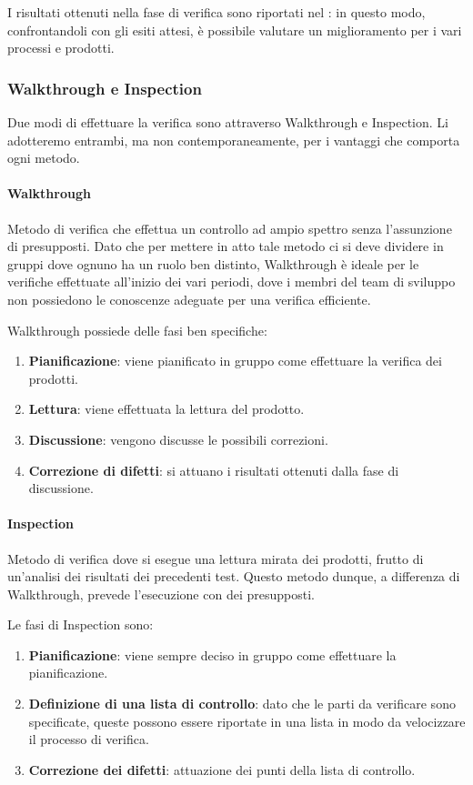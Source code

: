 		I risultati ottenuti nella fase di verifica sono riportati nel \PdQd: in questo modo, confrontandoli con gli esiti attesi,
		è possibile valutare un miglioramento per i vari processi e prodotti.

		\subsubsection{Walkthrough e Inspection}
		Due modi di effettuare la verifica sono attraverso Walkthrough e Inspection.
		Li adotteremo entrambi, ma non contemporaneamente, per i vantaggi che comporta ogni metodo.

			\paragraph{Walkthrough}
			Metodo di verifica che effettua un controllo ad ampio spettro senza l’assunzione di presupposti. Dato che per mettere in atto tale metodo ci
			si deve dividere in gruppi dove ognuno ha un ruolo ben distinto, Walkthrough è ideale per le verifiche effettuate all'inizio dei vari periodi,
			dove i membri del team di sviluppo non possiedono le conoscenze adeguate per una verifica efficiente.

			Walkthrough possiede delle fasi ben specifiche:

			\begin{enumerate}
				\item \textbf{Pianificazione}: viene pianificato in gruppo come effettuare la verifica dei prodotti.
				\item \textbf{Lettura}: viene effettuata la lettura del prodotto.
				\item \textbf{Discussione}: vengono discusse le possibili correzioni.
				\item \textbf{Correzione di difetti}: si attuano i risultati ottenuti dalla fase di discussione.
			\end{enumerate}

			\paragraph{Inspection}
			Metodo di verifica dove si esegue una lettura mirata dei prodotti, frutto di un'analisi dei risultati dei precedenti test.
			Questo metodo dunque, a differenza di Walkthrough, prevede l'esecuzione con dei presupposti.

			Le fasi di Inspection sono:

			\begin{enumerate}
				\item \textbf{Pianificazione}: viene sempre deciso in gruppo come effettuare la pianificazione.
				\item \textbf{Definizione di una lista di controllo}: dato che le parti da verificare sono specificate, queste possono essere
				riportate in una lista in modo da velocizzare il processo di verifica.
				\item \textbf{Correzione dei difetti}: attuazione dei punti della lista di controllo.
			\end{enumerate}

